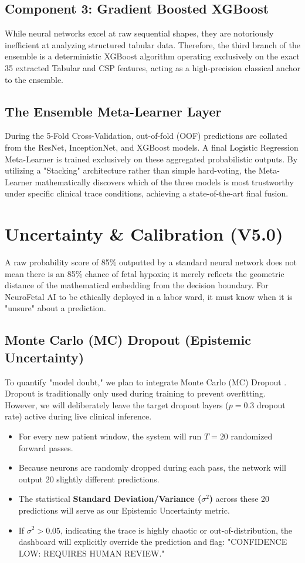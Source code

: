 \documentclass[12pt,a4paper]{report}
\begin{document}
\section{Component 3: Gradient Boosted XGBoost}
While neural networks excel at raw sequential shapes, they are notoriously inefficient at analyzing structured tabular data. Therefore, the third branch of the ensemble is a deterministic XGBoost algorithm operating exclusively on the exact 35 extracted Tabular and CSP features, acting as a high-precision classical anchor to the ensemble.

\section{The Ensemble Meta-Learner Layer}
During the 5-Fold Cross-Validation, out-of-fold (OOF) predictions are collated from the ResNet, InceptionNet, and XGBoost models. A final Logistic Regression Meta-Learner is trained exclusively on these aggregated probabilistic outputs. By utilizing a "Stacking" architecture rather than simple hard-voting, the Meta-Learner mathematically discovers which of the three models is most trustworthy under specific clinical trace conditions, achieving a state-of-the-art final fusion.

\chapter{Uncertainty \& Calibration (V5.0)}
A raw probability score of 85\% outputted by a standard neural network does not mean there is an 85\% chance of fetal hypoxia; it merely reflects the geometric distance of the mathematical embedding from the decision boundary. For NeuroFetal AI to be ethically deployed in a labor ward, it must know when it is "unsure" about a prediction.

\section{Monte Carlo (MC) Dropout (Epistemic Uncertainty)}
To quantify "model doubt," we plan to integrate Monte Carlo (MC) Dropout \cite{mcdropout1}. Dropout is traditionally only used during training to prevent overfitting. However, we will deliberately leave the target dropout layers ($p=0.3$ dropout rate) active during live clinical inference.
\begin{itemize}
    \item For every new patient window, the system will run $T=20$ randomized forward passes. 
    \item Because neurons are randomly dropped during each pass, the network will output 20 slightly different predictions.
    \item The statistical \textbf{Standard Deviation/Variance ($\sigma^2$)} across these 20 predictions will serve as our Epistemic Uncertainty metric. 
    \item If $\sigma^2 > 0.05$, indicating the trace is highly chaotic or out-of-distribution, the dashboard will explicitly override the prediction and flag: "CONFIDENCE LOW: REQUIRES HUMAN REVIEW."
\end{itemize}
\end{document}
